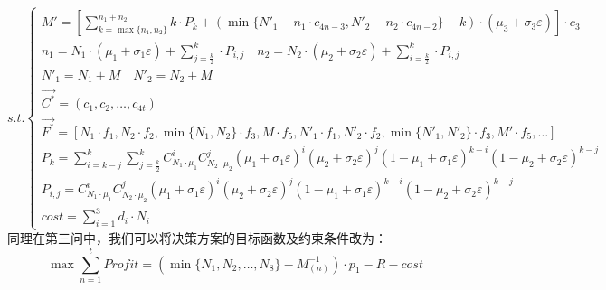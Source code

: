 \documentclass[withoutpreface,bwprint]{cumcmthesis} %
\begin{document}
\begin{equation*}
	s.t.\begin{cases}
		M'=[\sum_{k=\max \{n_{1},n_{2}\}}^{n_{1}+n_{2}}k\cdot P_{k}+(\min \{N'_{1}-n_{1}\cdot c_{4n-3},N'_{2}-n_{2}\cdot c_{4n-2}\}-k)\cdot (\mu_{3}+\sigma_{3}\varepsilon )]\cdot c_{3}                                                                     \\
		n_{1}=N_{1}\cdot (\mu_{1}+\sigma_{1}\varepsilon )+\sum_{j=\frac{k}{2}}^{k}\cdot P_{i,j} \quad n_{2}=N_{2}\cdot (\mu_{2}+\sigma_{2}\varepsilon )+\sum_{i=\frac{k}{2}}^{k}\cdot P_{i,j}                                                                \\
		N'_{1}=N_{1}+M \quad N'_{2}=N_{2}+M                                                                                                                                                                                                                  \\
		\vec{C^{*}}=(c_{1},c_{2},\dots,c_{4t})                                                                                                                                                                                                               \\
		\vec{F^{*}}=[N_{1}\cdot f_{1},N_{2}\cdot f_{2},\min \{N_{1},N_{2}\}\cdot f_{3},M\cdot f_{5},N'_{1}\cdot f_{1},N'_{2}\cdot f_{2},\min \{N'_{1},N'_{2}\}\cdot f_{3},M'\cdot f_{5},\dots]                                                               \\
		P_{k}=\sum_{i=k-j}^{k}\sum_{j=\frac{k}{2}}^{k}C_{N_{1}\cdot\mu_{1}}^{i}C_{N_{2}\cdot\mu_{2}}^{j}(\mu_{1}+\sigma_{1}\varepsilon)^{i}(\mu_{2}+\sigma_{2}\varepsilon)^{j}(1-\mu_{1}+\sigma_{1}\varepsilon)^{k-i}(1-\mu_{2}+\sigma_{2}\varepsilon)^{k-j} \\
		P_{i,j}=C_{N_{1}\cdot\mu_{1}}^{i}C_{N_{2}\cdot\mu_{2}}^{j}(\mu_{1}+\sigma_{1}\varepsilon)^{i}(\mu_{2}+\sigma_{2}\varepsilon)^{j}(1-\mu_{1}+\sigma_{1}\varepsilon)^{k-i}(1-\mu_{2}+\sigma_{2}\varepsilon)^{k-j}\\
		cost = \sum_{i=1}^{3}d_{i}\cdot N_{i}
	\end{cases}
\end{equation*}
同理在第三问中，我们可以将决策方案的目标函数及约束条件改为：
$$\max	\sum_{n=1}^{t}\textit{Profit}=(\min \{N_{1},N_{2},\dots,N_{8}\}-M_{(n)}^{-1})\cdot p_{1}-R -cost$$
\end{document}

